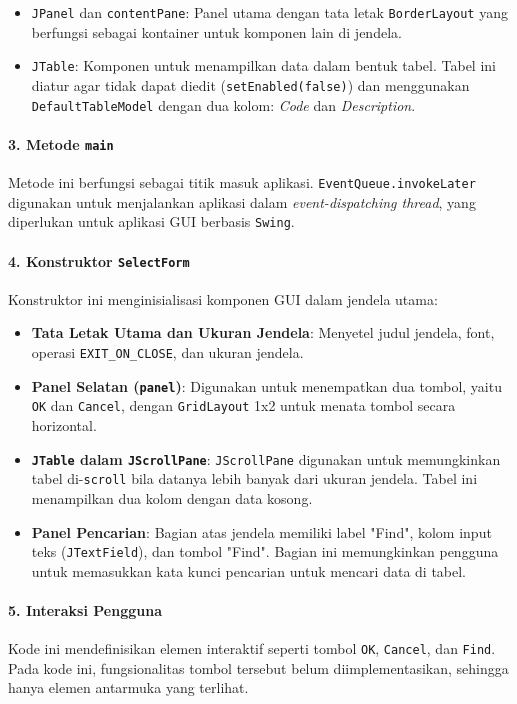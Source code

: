 \begin{itemize}
	\item \texttt{JPanel} dan \texttt{contentPane}: Panel utama dengan tata letak \texttt{BorderLayout} yang berfungsi sebagai kontainer untuk komponen lain di jendela.
	\item \texttt{JTable}: Komponen untuk menampilkan data dalam bentuk tabel. Tabel ini diatur agar tidak dapat diedit (\texttt{setEnabled(false)}) dan menggunakan \texttt{DefaultTableModel} dengan dua kolom: \textit{Code} dan \textit{Description}.
\end{itemize}

\paragraph{3. Metode \texttt{main}}
Metode ini berfungsi sebagai titik masuk aplikasi. \texttt{EventQueue.invokeLater} digunakan untuk menjalankan aplikasi dalam \textit{event-dispatching thread}, yang diperlukan untuk aplikasi GUI berbasis \texttt{Swing}.

\paragraph{4. Konstruktor \texttt{SelectForm}}
Konstruktor ini menginisialisasi komponen GUI dalam jendela utama:
\begin{itemize}
	\item \textbf{Tata Letak Utama dan Ukuran Jendela}: Menyetel judul jendela, font, operasi \texttt{EXIT\_ON\_CLOSE}, dan ukuran jendela.
	\item \textbf{Panel Selatan (\texttt{panel})}: Digunakan untuk menempatkan dua tombol, yaitu \texttt{OK} dan \texttt{Cancel}, dengan \texttt{GridLayout} 1x2 untuk menata tombol secara horizontal.
	\item \textbf{\texttt{JTable} dalam \texttt{JScrollPane}}: \texttt{JScrollPane} digunakan untuk memungkinkan tabel di-\texttt{scroll} bila datanya lebih banyak dari ukuran jendela. Tabel ini menampilkan dua kolom dengan data kosong.
	\item \textbf{Panel Pencarian}: Bagian atas jendela memiliki label "Find", kolom input teks (\texttt{JTextField}), dan tombol "Find". Bagian ini memungkinkan pengguna untuk memasukkan kata kunci pencarian untuk mencari data di tabel.
\end{itemize}

\paragraph{5. Interaksi Pengguna}
Kode ini mendefinisikan elemen interaktif seperti tombol \texttt{OK}, \texttt{Cancel}, dan \texttt{Find}. Pada kode ini, fungsionalitas tombol tersebut belum diimplementasikan, sehingga hanya elemen antarmuka yang terlihat.

